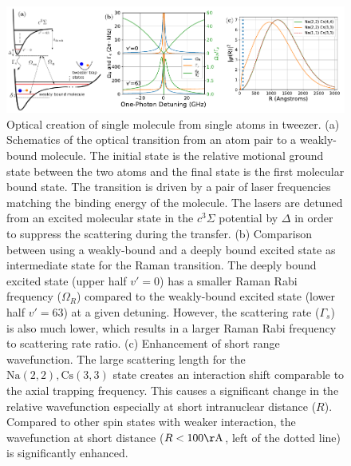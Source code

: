 \documentclass[aps,prl,twocolumn,superscriptaddress]{revtex4-1}
\newcommand{\Na}{\mathrm{Na}}
\newcommand{\Cs}{\mathrm{Cs}}
\begin{document}
\begin{figure}
  \includegraphics[width=\textwidth]{fig1.pdf}
  \caption{Optical creation of single molecule from single atoms in tweezer.
    (a) Schematics of the optical transition from an atom pair to a weakly-bound molecule.
    The initial state is the relative motional ground state between the two atoms
    and the final state is the first molecular bound state.
    The transition is driven by a pair of laser frequencies matching the binding energy
    of the molecule.
    The lasers are detuned from an excited molecular state in the $c^3\Sigma$ potential
    by $\Delta$ in order to suppress the scattering during the transfer.
    (b) Comparison between using a weakly-bound and a deeply bound excited state
    as intermediate state for the Raman transition.
    The deeply bound excited state (upper half $v'=0$)
    has a smaller Raman Rabi frequency ($\Omega_{R}$)
    compared to the weakly-bound excited state (lower half $v'=63$) at a given detuning.
    However, the scattering rate ($\Gamma_{s}$) is also much lower,
    which results in a larger Raman Rabi frequency to scattering rate ratio.
    (c) Enhancement of short range wavefunction.
    The large scattering length for the $\Na(2,2),\Cs(3,3)$ state creates an interaction shift
    comparable to the axial trapping frequency.
    This causes a significant change in the relative wavefunction especially at short
    intranuclear distance ($R$).
    Compared to other spin states with weaker interaction,
    the wavefunction at short distance ($R<100\mathrm{\AA}$, left of the dotted line)
    is significantly enhanced.
    \label{f-theory}
  }
\end{figure}




\end{document}
